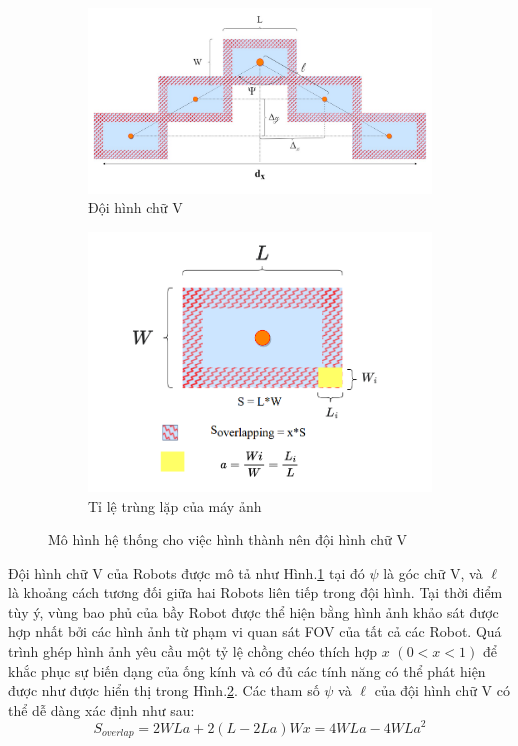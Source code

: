 \begin{figure}[!t]
\centering
    \begin{subfigure}[b]{0.8\textwidth}
    \centering
    \includegraphics[width=\textwidth]{chapter3/image/SwarmRobotic_.drawio.pdf}
    \caption{Đội hình chữ V}
    \label{fig:Vshapemodel1}
    \end{subfigure}
    \begin{subfigure}[b]{0.6\textwidth}
    \centering
    \includegraphics[width=\textwidth]{chapter3/image/a.png}
    \caption{Tỉ lệ trùng lặp của máy ảnh}
    \label{fig:Overlapingmodel1}
    \end{subfigure}
    \caption{Mô hình hệ thống cho việc hình thành nên đội hình chữ V}
    \label{fig:systemmodel}
\end{figure}

Đội hình chữ V của Robots được mô tả như Hình.\ref{fig:Vshapemodel1} tại đó $\psi$ là góc chữ V, và $\ell$ là khoảng cách tương đối giữa hai Robots liên tiếp trong đội hình. Tại thời điểm tùy ý, vùng bao phủ của bầy Robot được thể hiện bằng hình ảnh khảo sát được hợp nhất bởi các hình ảnh từ phạm vi quan sát FOV của tất cả các Robot. Quá trình ghép hình ảnh yêu cầu một tỷ lệ chồng chéo thích hợp $x$ $(0<x<1)$ để khắc phục sự biến dạng của ống kính và có đủ các tính năng có thể phát hiện được như được hiển thị trong Hình.\ref{fig:Overlapingmodel1}. Các tham số $\psi$ và $\ell$ của đội hình chữ V có thể dễ dàng xác định như sau: 
\begin{equation}
   S_{overlap}=2WLa+2(L-2La)Wx=4WLa-4WLa^{2}
\label{eq:S}
\end{equation}
 

